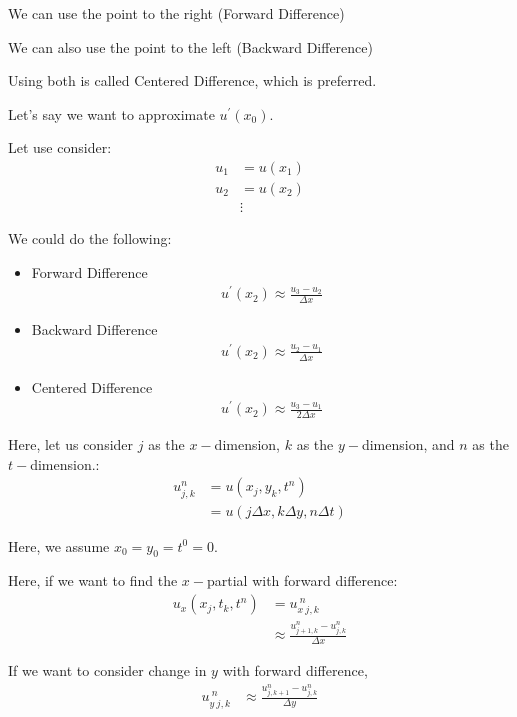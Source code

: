 We can use the point to the right (Forward Difference)

We can also use the point to the left (Backward Difference)

Using both is called Centered Difference, which is preferred.


Let's say we want to approximate $u^\prime(x_0)$.

Let use consider:
%
\begin{align}
  u_1 & = u(x_1)\\
  u_2 & = u(x_2)\\
  & \vdots
\end{align}

We could do the following:
%
\begin{itemize}
  \item Forward Difference
  \begin{align}
    u^\prime(x_2) \approx \frac{u_3 - u_2}{\Delta x}
  \end{align}
  \item Backward Difference
  \begin{align}
    u^\prime(x_2) \approx \frac{u_2 - u_1}{\Delta x}
  \end{align}
  \item Centered Difference
  \begin{align}
    u^\prime(x_2) \approx \frac{u_3 - u_1}{2 \Delta x}
  \end{align}
\end{itemize}

Here, let us consider $j$ as the $x-$dimension, $k$ as the $y-$dimension, and $n$ as the $t-$dimension.:
%
\begin{align}
  u^n_{j, k} & = u(x_j, y_k, t^n)\\
  & = u(j \Delta x, k \Delta y, n \Delta t)
\end{align}

Here, we assume $x_0 = y_0 = t^0 = 0$.

Here, if we want to find the $x-$partial with forward difference:
%
\begin{align}
  u_x(x_j, t_k, t^n) & = u^{\ n}_{x\ j, k}\\
  & \approx \frac{u^n_{j + 1, k}-u^n_{j, k}}{\Delta x}
\end{align}

If we want to consider change in $y$ with forward difference,
%
\begin{align}
  u^{\ n}_{y\ j, k}
  & \approx \frac{u^n_{j, k + 1}-u^n_{j, k}}{\Delta y}
\end{align}

